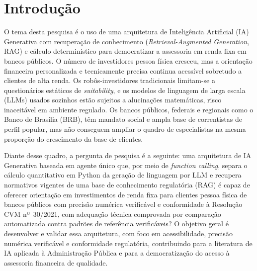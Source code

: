 
\section{Introdução}

O tema desta pesquisa é o uso de uma arquitetura de Inteligência Artificial
(IA) Generativa com recuperação de conhecimento (\textit{Retrieval-Augmented
Generation}, RAG) e cálculo determinístico para democratizar a assessoria em
renda fixa em bancos públicos. O número de investidores pessoa física cresceu,
mas a orientação financeira personalizada e tecnicamente precisa continua
acessível sobretudo a clientes de alta renda. Os robôs-investidores
tradicionais limitam-se a questionários estáticos de \textit{suitability}, e os
modelos de linguagem de larga escala (LLMs) usados sozinhos estão sujeitos a
alucinações matemáticas, risco inaceitável em ambiente regulado. Os bancos
públicos, federais e regionais como o Banco de Brasília (BRB), têm mandato
social e ampla base de correntistas de perfil popular, mas não conseguem
ampliar o quadro de especialistas na mesma proporção do crescimento da base de
clientes.

Diante desse quadro, a pergunta de pesquisa é a seguinte: uma arquitetura de
IA Generativa baseada em agente único que, por meio de \textit{function
calling}, separa o cálculo quantitativo em Python da geração de linguagem por
LLM e recupera normativos vigentes de uma base de conhecimento regulatória
(RAG) é capaz de oferecer orientação em investimentos de renda fixa para
clientes pessoa física de bancos públicos com precisão numérica verificável e
conformidade à Resolução CVM nº~30/2021, com adequação técnica comprovada por
comparação automatizada contra padrões de referência verificáveis? O objetivo
geral é desenvolver e validar essa arquitetura, com foco em acessibilidade,
precisão numérica verificável e conformidade regulatória, contribuindo para a
literatura de IA aplicada à Administração Pública e para a democratização do
acesso à assessoria financeira de qualidade.
